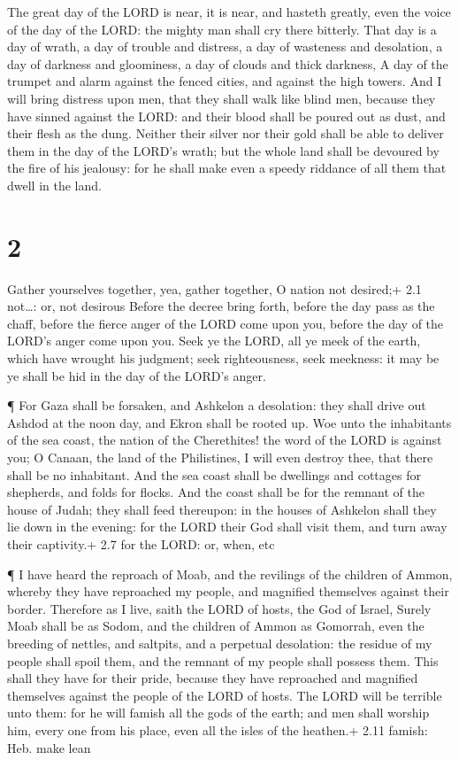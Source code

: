  The great day of the LORD is near, it is near, and hasteth
greatly, even the voice of the day of the LORD: the mighty man shall cry
there bitterly.  That day is a day of wrath, a day of
trouble and distress, a day of wasteness and desolation, a day of
darkness and gloominess, a day of clouds and thick darkness,
 A day of the trumpet and alarm against the fenced cities,
and against the high towers.  And I will bring distress
upon men, that they shall walk like blind men, because they have sinned
against the LORD: and their blood shall be poured out as dust, and their
flesh as the dung.  Neither their silver nor their gold
shall be able to deliver them in the day of the LORD's wrath; but the
whole land shall be devoured by the fire of his jealousy: for he shall
make even a speedy riddance of all them that dwell in the land.

\hypertarget{section-1}{%
\section{2}\label{section-1}}

 Gather yourselves together, yea, gather together, O nation
not desired;+ 2.1 not\ldots: or, not desirous  Before the
decree bring forth, before the day pass as the chaff, before the fierce
anger of the LORD come upon you, before the day of the LORD's anger come
upon you.  Seek ye the LORD, all ye meek of the earth, which
have wrought his judgment; seek righteousness, seek meekness: it may be
ye shall be hid in the day of the LORD's anger.

 ¶ For Gaza shall be forsaken, and Ashkelon a desolation:
they shall drive out Ashdod at the noon day, and Ekron shall be rooted
up.  Woe unto the inhabitants of the sea coast, the nation
of the Cherethites! the word of the LORD is against you; O Canaan, the
land of the Philistines, I will even destroy thee, that there shall be
no inhabitant.  And the sea coast shall be dwellings and
cottages for shepherds, and folds for flocks.  And the coast
shall be for the remnant of the house of Judah; they shall feed
thereupon: in the houses of Ashkelon shall they lie down in the evening:
for the LORD their God shall visit them, and turn away their captivity.+
2.7 for the LORD: or, when, etc

 ¶ I have heard the reproach of Moab, and the revilings of
the children of Ammon, whereby they have reproached my people, and
magnified themselves against their border.  Therefore as I
live, saith the LORD of hosts, the God of Israel, Surely Moab shall be
as Sodom, and the children of Ammon as Gomorrah, even the breeding of
nettles, and saltpits, and a perpetual desolation: the residue of my
people shall spoil them, and the remnant of my people shall possess
them.  This shall they have for their pride, because they
have reproached and magnified themselves against the people of the LORD
of hosts.  The LORD will be terrible unto them: for he will
famish all the gods of the earth; and men shall worship him, every one
from his place, even all the isles of the heathen.+ 2.11 famish: Heb.
make lean

